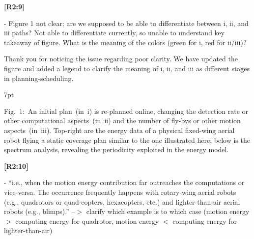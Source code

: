 \documentclass[10pt]{letter}
\newenvironment{formal}{%
  \def\FrameCommand{%
    \hspace{1pt}%
    {\color{red}\vrule width 2pt}%
    {\color{formalshade}\vrule width 4pt}%
    \colorbox{formalshade}%
  }%
  \MakeFramed{\advance\hsize-\width\FrameRestore}%
  \noindent\hspace{-4.55pt}%
  \begin{adjustwidth}{}{7pt}%
  \vspace{2pt}\vspace{2pt}%
}
{%
  \vspace{2pt}\end{adjustwidth}\endMakeFramed%
}
\begin{document}
{\hspace*{-4.5em}\textbf{[R2:9]}\vspace*{-1.9em}}

- Figure 1 not clear; are we supposed to be able to differentiate between i, ii, and iii paths? Not able to differentiate currently, so unable to understand key takeaway of figure. What is the meaning of the colors (green for i, red for ii/iii)?
  
{\color{blue} 

{\hspace*{-4.5em}{[R2:9]}\vspace*{-1.9em}}

Thank you for noticing the issue regarding poor clarity. We have updated the figure and added a legend to clarify the meaning of i, ii, and iii as different stages in planning-scheduling.

\begin{formal}
\color{black}
  {\color{blue}\scriptsize }
  {\color{black}\footnotesize%
  Fig.~1:~An initial plan~(in~{\color{red}i}) {\color{blue}is} re-planned online, changing the %
  detection rate or other computational aspects~(in~{\color{red}ii}) and %
  the number of fly-bys or other motion aspects~(in~{\color{red}iii}). 
  {\color{blue}Top-right} %
  {\color{blue}are} the energy data of a physical fixed-wing aerial robot flying a static coverage plan similar to the one illustrated here{\color{blue}; below is }%
  the spectrum analysis, %
  revealing the periodicity %
  exploited in the %
  energy model.
  }
  \vspace*{1ex}
\end{formal}

}

{\hspace*{-4.5em}\textbf{[R2:10]}\vspace*{-1.9em}}

- ``i.e., when the motion energy contribution far outreaches the computations or vice-versa. The occurrence frequently happens with rotary-wing aerial robots (e.g., quadrotors or quad-copters, hexacopters, etc.) and lighter-than-air aerial robots (e.g., blimps).'' --$>$ clarify which example is to which case (motion energy $>$ computing energy for quadrotor, motion energy $<$ computing energy for lighter-than-air)
  
\end{document}

